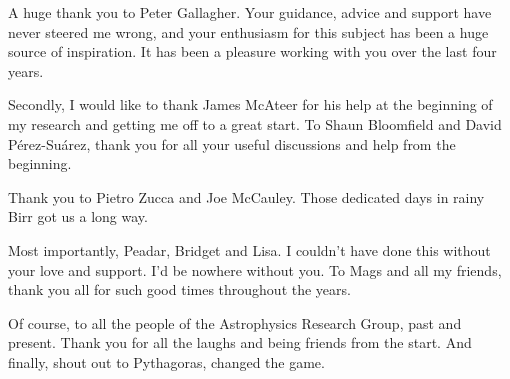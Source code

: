 




\begin{acknowledgements}      

A huge thank you to Peter Gallagher. Your guidance, advice and support have never steered me wrong, and your enthusiasm for this subject has been a huge source of inspiration. It has been a pleasure working with you over the last four years. 

Secondly, I would like to thank James McAteer for his help at the beginning of my research and getting me off to a great start. To Shaun Bloomfield and David P\'{e}rez-Su\'{a}rez, thank you for all your useful discussions and help from the beginning.

Thank you to Pietro Zucca and Joe McCauley. Those dedicated days in rainy Birr got us a long way.

Most importantly, Peadar, Bridget and Lisa. I couldn't have done this without your love and support. I'd be nowhere without you. To Mags and all my friends, thank you all for such good times throughout the years.

Of course, to all the people of the Astrophysics Research Group, past and present. Thank you for all the laughs and being friends from the start. And finally, shout out to Pythagoras, changed the game.

\end{acknowledgements}




